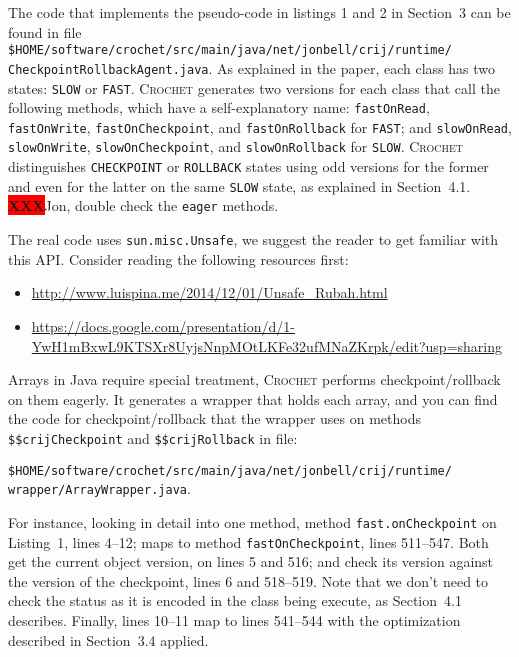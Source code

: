 \documentclass[12pt]{article}
\newcommand{\vm}[1]{\colorbox{green!20}{\texttt{\color{black}#1}}}
\newcommand{\XXX}{\colorbox{red}{\bf\color{white}XXX}}
\newcommand{\sysname}{\textsc{Crochet}\xspace}
\begin{document}
The code that implements the pseudo-code in listings 1 and 2 in Section~3 can be
found in file\\
\vm{\$HOME/software/crochet/src/main/java/net/jonbell/crij/runtime/}\\\vm{CheckpointRollbackAgent.java}.
As explained in the paper, each class has two states:  \texttt{SLOW} or
\texttt{FAST}.  \sysname generates two versions for each class that call the
following methods, which have a self-explanatory name: \texttt{fastOnRead},
\texttt{fastOnWrite}, \texttt{fastOnCheckpoint}, and \texttt{fastOnRollback} for
\texttt{FAST}; and \texttt{slowOnRead}, \texttt{slowOnWrite},
\texttt{slowOnCheckpoint}, and \texttt{slowOnRollback} for \texttt{SLOW}.
\sysname distinguishes \texttt{CHECKPOINT} or \texttt{ROLLBACK} states using
odd versions for the former and even for the latter on the same \texttt{SLOW}
state, as explained in Section~4.1. \XXX Jon, double check the \texttt{eager}
methods.

The real code uses \texttt{sun.misc.Unsafe}, we suggest the reader to get
familiar with this API.  Consider reading the following resources first:

\begin{itemize}

    \item \url{http://www.luispina.me/2014/12/01/Unsafe_Rubah.html}

    \item \href{https://docs.google.com/presentation/d/1-YwH1mBxwL9KTSXr8UyjsNnpMOtLKFe32ufMNaZKrpk/edit?usp=sharing}{https://docs.google.com/presentation/d/1-\\YwH1mBxwL9KTSXr8UyjsNnpMOtLKFe32ufMNaZKrpk/edit?usp=sharing}

\end{itemize}

Arrays in Java require special treatment, \sysname performs checkpoint/rollback
on them eagerly.  It generates a wrapper that holds each array, and you can find
the code for checkpoint/rollback that the wrapper uses on methods
\texttt{\$\$crijCheckpoint} and \texttt{\$\$crijRollback} in file:

\vm{\$HOME/software/crochet/src/main/java/net/jonbell/crij/runtime/}\\\vm{wrapper/ArrayWrapper.java}.

For instance, looking in detail into one method, method
\texttt{fast.onCheckpoint} on Listing~1, lines 4--12; maps to method
\texttt{fastOnCheckpoint}, lines 511--547.  Both get the current object version,
on lines 5 and 516; and check its version against the version of the checkpoint,
lines 6 and 518--519.  Note that we don't need to check the status as it is
encoded in the class being execute, as Section~4.1 describes.  Finally, lines
10--11 map to lines 541--544 with the optimization described in Section~3.4
applied.
\end{document}
